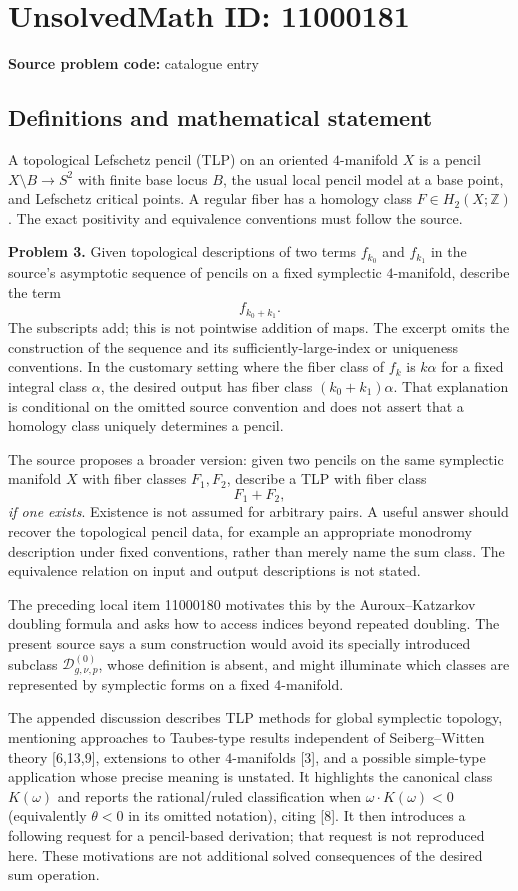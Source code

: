 \documentclass[11pt]{article}
\newcommand{\Z}{\mathbb{Z}}
\begin{document}
\section*{UnsolvedMath ID: 11000181}
\textbf{Source problem code:} catalogue entry
\subsection{Definitions and mathematical statement}
A topological Lefschetz pencil (TLP) on an oriented $4$-manifold $X$ is a pencil $X\setminus B\to S^2$ with finite base locus $B$, the usual local pencil model at a base point, and Lefschetz critical points. A regular fiber has a homology class $F\in H_2(X;\Z)$. The exact positivity and equivalence conventions must follow the source.

\textbf{Problem 3.} Given topological descriptions of two terms $f_{k_0}$ and $f_{k_1}$ in the source's asymptotic sequence of pencils on a fixed symplectic $4$-manifold, describe the term
\[
 f_{k_0+k_1}.
\]
The subscripts add; this is not pointwise addition of maps. The excerpt omits the construction of the sequence and its sufficiently-large-index or uniqueness conventions. In the customary setting where the fiber class of $f_k$ is $k\alpha$ for a fixed integral class $\alpha$, the desired output has fiber class $(k_0+k_1)\alpha$. That explanation is conditional on the omitted source convention and does not assert that a homology class uniquely determines a pencil.

The source proposes a broader version: given two pencils on the same symplectic manifold $X$ with fiber classes $F_1,F_2$, describe a TLP with fiber class
\[
 F_1+F_2,
\]
\emph{if one exists}. Existence is not assumed for arbitrary pairs. A useful answer should recover the topological pencil data, for example an appropriate monodromy description under fixed conventions, rather than merely name the sum class. The equivalence relation on input and output descriptions is not stated.

The preceding local item 11000180 motivates this by the Auroux--Katzarkov doubling formula and asks how to access indices beyond repeated doubling. The present source says a sum construction would avoid its specially introduced subclass $\mathcal D^{(0)}_{g,\nu,p}$, whose definition is absent, and might illuminate which classes are represented by symplectic forms on a fixed $4$-manifold.

The appended discussion describes TLP methods for global symplectic topology, mentioning approaches to Taubes-type results independent of Seiberg--Witten theory [6,13,9], extensions to other $4$-manifolds [3], and a possible simple-type application whose precise meaning is unstated. It highlights the canonical class $K(\omega)$ and reports the rational/ruled classification when $\omega\cdot K(\omega)<0$ (equivalently $\theta<0$ in its omitted notation), citing [8]. It then introduces a following request for a pencil-based derivation; that request is not reproduced here. These motivations are not additional solved consequences of the desired sum operation.
\end{document}
